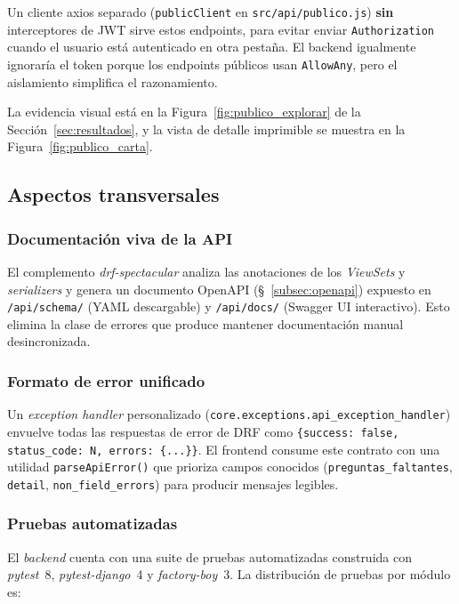 Un cliente axios separado (\texttt{publicClient} en \texttt{src/api/publico.js}) \textbf{sin} interceptores de JWT sirve estos endpoints, para evitar enviar \texttt{Authorization} cuando el usuario está autenticado en otra pestaña. El backend igualmente ignoraría el token porque los endpoints públicos usan \texttt{AllowAny}, pero el aislamiento simplifica el razonamiento.

La evidencia visual está en la Figura~\ref{fig:publico_explorar} de la Sección~\ref{sec:resultados}, y la vista de detalle imprimible se muestra en la Figura~\ref{fig:publico_carta}.

\subsection{Aspectos transversales}

\subsubsection{Documentación viva de la API}

El complemento \emph{drf-spectacular} analiza las anotaciones de los \emph{ViewSets} y \emph{serializers} y genera un documento OpenAPI (\S~\ref{subsec:openapi}) expuesto en \texttt{/api/schema/} (YAML descargable) y \texttt{/api/docs/} (Swagger UI interactivo). Esto elimina la clase de errores que produce mantener documentación manual desincronizada.

\subsubsection{Formato de error unificado}

Un \emph{exception handler} personalizado (\texttt{core.exceptions.api\_exception\_handler}) envuelve todas las respuestas de error de DRF como \texttt{\{success: false, status\_code: N, errors: \{...\}\}}. El frontend consume este contrato con una utilidad \texttt{parseApiError()} que prioriza campos conocidos (\texttt{preguntas\_faltantes}, \texttt{detail}, \texttt{non\_field\_errors}) para producir mensajes legibles.

\subsubsection{Pruebas automatizadas}\label{sec:testing}

El \emph{backend} cuenta con una suite de pruebas automatizadas construida con \emph{pytest}~8, \emph{pytest-django}~4 y \emph{factory-boy}~3. La distribución de pruebas por módulo es:

